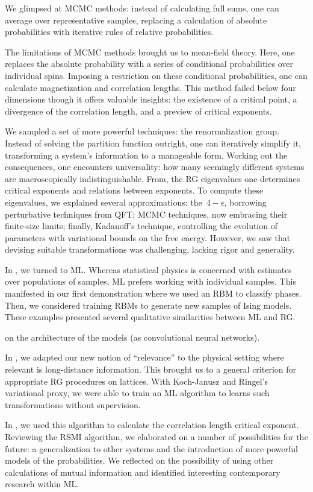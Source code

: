 We glimpsed at MCMC methods: instead of calculating full sums, one can
average over representative samples, replacing a calculation of
absolute probabilities with iterative rules of relative probabilities.

The limitations of MCMC methods brought us to mean-field theory. Here,
one replaces the absolute probability with a series of conditional
probabilities over individual spins. Imposing a restriction on these
conditional probabilities, one can calculate magnetization and
correlation lengths. This method failed below four dimensions though
it offers valuable insights: the existence of a critical point, a
divergence of the correlation length, and a preview of critical
exponents.

We sampled a set of more powerful techniques: the renormalization
group.  Instead of solving the partition function outright, one can
iteratively simplify it, transforming a system's information to a
manageable form. Working out the consequences, one encounters
universality: how many seemingly different systems are macroscopically
indistinguishable. From, the RG eigenvalues one determines critical
exponents and relations between exponents. To compute these eigenvalues,
we explained several approximations: the~$4-\epsilon$, borrowing perturbative
techniques from QFT\@; MCMC techniques, now embracing their
finite-size limits; finally, Kadanoff's technique, controlling the
evolution of parameters with variational bounds on the free
energy. However, we saw that devising suitable transformations was
challenging, lacking rigor and generality.

In , we turned to ML\@. Whereas statistical physics is
concerned with estimates over populations of samples, ML prefers
working with individual samples. This manifested in our first
demonstration where we used an RBM to classify phases.  Then, we
considered training RBMs to generate new samples of Ising
models. These examples presented several qualitative similarities
between ML and RG\@.

on the architecture of the models (as convolutional neural networks).

In , we adapted our new notion of ``relevance'' to the
physical setting where relevant is long-distance information. This
brought us to a general criterion for appropriate RG procedures on
lattices. With Koch-Janusz and Ringel's variational proxy, we were
able to train an ML algorithm to learns such transformations without
supervision.

In , we used this algorithm to calculate the
correlation length critical exponent. Reviewing the RSMI algorithm, we
elaborated on a number of possibilities for the future: a
generalization to other systems and the introduction of more powerful
models of the probabilities. We reflected on the possibility of using
other calculations of mutual information and identified interesting
contemporary research within ML\@.
